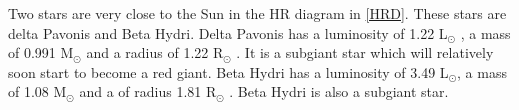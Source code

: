 \documentclass{aa}
\begin{document}


Two stars are very close to the Sun in the HR diagram in \ref{HRD}.
%
These stars are delta Pavonis and Beta Hydri.
%
Delta Pavonis has a luminosity of 1.22 L$_\odot$ \citep{Bruntt_2010}, a mass of 0.991 M$_\odot$ and a radius of 1.22 R$_\odot$ \citep{2008yCat..21680297T}.
%
It is a subgiant star which will relatively soon start to become a red giant.
%
Beta Hydri has a luminosity of 3.49 L$_\odot$, a mass of 1.08 M$_\odot$ and a of radius 1.81 R$_\odot$ \citep{Brand_o_2011}.
%
Beta Hydri is also a subgiant star. 


\end{document}
